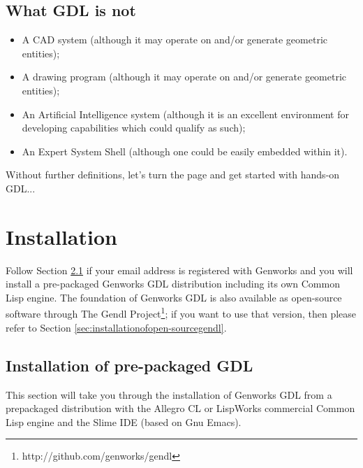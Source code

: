 \documentclass [11pt]{book}
\begin{document}
\section{What GDL is not}

\label{sec:whatgdlisnot}



\begin{itemize}

\item A CAD system (although it may operate on and/or generate geometric entities);

\item A drawing program (although it may operate on and/or generate geometric entities);

\item An Artificial Intelligence system (although it is an
excellent environment for developing capabilities which could qualify
as such);

\item An Expert System Shell (although one could be easily embedded within it).

\end{itemize}

Without further definitions, let's turn the page and get
      started with hands-on GDL...

\chapter{Installation}

\label{chap:installation}

Follow Section 
\ref{sec:installationofpre-packagedgdl} if your email address is registered with Genworks and you will
install a pre-packaged Genworks GDL distribution including its own
Common Lisp engine.  The foundation of Genworks GDL is also available
as open-source software through The Gendl Project\footnote{http://github.com/genworks/gendl}; if you want to use that version, then please refer to Section 
\ref{sec:installationofopen-sourcegendl}.

\section{Installation of pre-packaged GDL}

\label{sec:installationofpre-packagedgdl}

This section will take you through the installation of
Genworks GDL from a prepackaged distribution with the Allegro CL or
LispWorks commercial Common Lisp engine and the Slime IDE (based on
Gnu Emacs).
\end{document}
